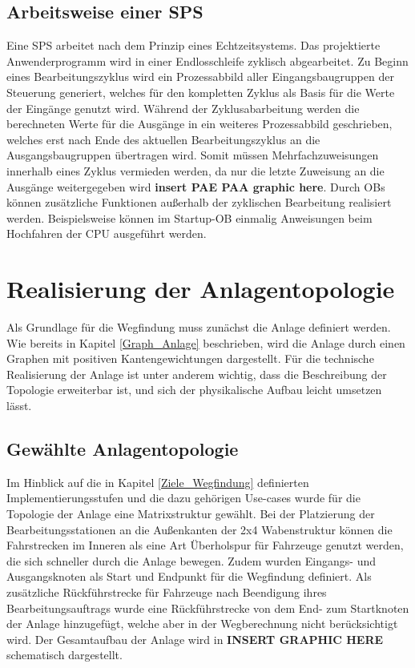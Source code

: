 	
		\subsection{Arbeitsweise einer SPS}
			
			Eine \acl{SPS} arbeitet nach dem Prinzip eines Echtzeitsystems. Das projektierte Anwenderprogramm wird in einer Endlosschleife zyklisch abgearbeitet. Zu Beginn eines Bearbeitungszyklus wird ein Prozessabbild aller Eingangsbaugruppen  der Steuerung generiert, welches für den kompletten Zyklus als Basis für die Werte der Eingänge genutzt wird. Während der Zyklusabarbeitung werden die berechneten Werte für die Ausgänge in ein weiteres Prozessabbild geschrieben, welches erst nach Ende des aktuellen Bearbeitungszyklus an die Ausgangsbaugruppen übertragen wird. Somit müssen Mehrfachzuweisungen innerhalb eines Zyklus vermieden werden, da nur die letzte Zuweisung an die Ausgänge weitergegeben wird \textbf{insert PAE PAA graphic here}. Durch \ac{OB}s können zusätzliche Funktionen außerhalb der zyklischen Bearbeitung realisiert werden. Beispielsweise können im Startup-\ac{OB} einmalig Anweisungen beim Hochfahren der CPU ausgeführt werden.
	
	\section{Realisierung der Anlagentopologie}
		
		Als Grundlage für die Wegfindung muss zunächst die Anlage definiert werden. Wie bereits in Kapitel \ref{Graph_Anlage} beschrieben, wird die Anlage durch einen Graphen mit positiven Kantengewichtungen dargestellt. Für die technische Realisierung der Anlage ist unter anderem wichtig, dass die Beschreibung der Topologie erweiterbar ist, und sich der physikalische Aufbau leicht umsetzen lässt.
		
		\subsection{Gewählte Anlagentopologie}
			
			Im Hinblick auf die in Kapitel \ref{Ziele_Wegfindung} definierten Implementierungsstufen und die dazu gehörigen Use-cases wurde für die Topologie der Anlage eine Matrixstruktur gewählt.  Bei der Platzierung der Bearbeitungsstationen an die Außenkanten der 2x4 Wabenstruktur können die Fahrstrecken im Inneren als eine Art Überholspur für Fahrzeuge genutzt werden, die sich schneller durch die Anlage bewegen. Zudem wurden Eingangs- und Ausgangsknoten als Start und Endpunkt für die Wegfindung definiert. Als zusätzliche Rückführstrecke für Fahrzeuge nach Beendigung ihres Bearbeitungsauftrags wurde eine Rückführstrecke von dem End- zum Startknoten der Anlage hinzugefügt, welche aber in der Wegberechnung nicht berücksichtigt wird. Der Gesamtaufbau der Anlage wird in \textbf{INSERT GRAPHIC HERE} schematisch dargestellt.
		
